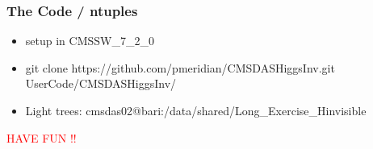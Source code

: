 \documentclass[red,compress,xcolor=table]{beamer}
\begin{document}
\begin{frame}%
\frametitle{The Code / ntuples}

\begin{itemize}
\item \scriptsize setup in CMSSW\_7\_2\_0
\item \scriptsize git clone https://github.com/pmeridian/CMSDASHiggsInv.git UserCode/CMSDASHiggsInv/
\item \scriptsize Light trees: cmsdas02@bari:/data/shared/Long\_Exercise\_Hinvisible
\end{itemize}

\centering \Huge \textcolor{red}{HAVE FUN !!}

\end{frame}
\end{document}
